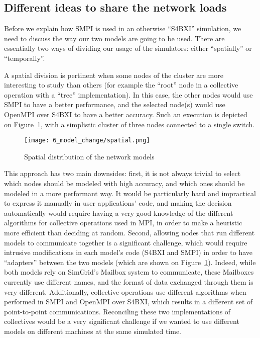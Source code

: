 \subsection{Different ideas to share the network loads}
\label{sec:6_model_change:division}

Before we explain how SMPI is used in an otherwise ``S4BXI'' simulation, we need
to discuss the way our two models are going to be used. There are essentially
two ways of dividing our usage of the simulators: either ``spatially'' or
``temporally''.

A spatial division is pertinent when some nodes of the cluster are more
interesting to study than others (for example the ``root'' node in a collective
operation with a ``tree'' implementation). In this case, the other nodes would
use SMPI to have a better performance, and the selected node(s) would use
OpenMPI over S4BXI to have a better accuracy. Such an execution is depicted on
Figure~\ref{fig:6_model_change:spatial}, with a simplistic cluster of three
nodes connected to a single switch.

\begin{figure}[!ht]
    \centering
    \texttt{[image: 6\_model\_change/spatial.png]}
    \caption{Spatial distribution of the network models}
    \label{fig:6_model_change:spatial}
\end{figure}

This approach has two main downsides: first, it is not always trivial to select
which nodes should be modeled with high accuracy, and which ones should be
modeled in a more performant way. It would be particularly hard and impractical
to express it manually in user applications' code, and making the decision
automatically would require having a very good knowledge of the different
algorithms for collective operations used in MPI, in order to make a heuristic
more efficient than deciding at random. Second, allowing nodes that run
different models to communicate together is a significant challenge, which would
require intrusive modifications in each model's code (S4BXI and SMPI) in order
to have ``adapters'' between the two models (which are shown on
Figure~\ref{fig:6_model_change:spatial}). Indeed, while both models rely on
SimGrid's Mailbox system to communicate, these Mailboxes currently use different
names, and the format of data exchanged through them is very different.
Additionally, collective operations use different algorithms when performed in
SMPI and OpenMPI over S4BXI, which results in a different set of point-to-point
communications. Reconciling these two implementations of collectives would be a
very significant challenge if we wanted to use different models on different
machines at the same simulated time.

